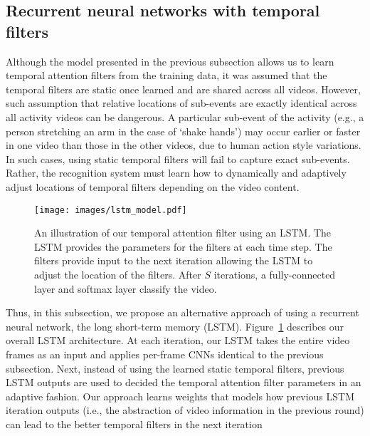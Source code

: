 \documentclass[letterpaper]{article}
\begin{document}
\subsection{Recurrent neural networks with temporal filters}
\label{subsec:lstm}

Although the model presented in the previous subsection allows us to learn temporal attention filters from the training data, it was assumed that the temporal filters are static once learned and are shared across all videos. However, such assumption that relative locations of sub-events are exactly identical across all activity videos can be dangerous. A particular sub-event of the activity (e.g., a person stretching an arm in the case of `shake hands') may occur earlier or faster in one video than those in the other videos, due to human action style variations. In such cases, using static temporal filters will fail to capture exact sub-events. Rather, the recognition system must learn how to dynamically and adaptively adjust locations of temporal filters depending on the video content.

\begin{figure}[!tbp]
\begin{center}
   \texttt{[image: images/lstm\_model.pdf]}
\end{center}
   \caption{An illustration of our temporal attention filter using an LSTM. The LSTM provides the parameters for the filters at each time step. The filters provide input to the next iteration allowing the LSTM to adjust the location of the filters. After $S$ iterations, a fully-connected layer and softmax layer classify the video. }
\label{fig:lstm_model}		
\end{figure}




Thus, in this subsection, we propose an alternative approach of using a recurrent neural network, the long short-term memory (LSTM). Figure~\ref{fig:lstm_model} describes our overall LSTM architecture. At each iteration, our LSTM takes the entire video frames as an input and applies per-frame CNNs identical to the previous subsection. Next, instead of using the learned static temporal filters, previous LSTM outputs are used to decided the temporal attention filter parameters in an adaptive fashion. Our approach learns weights that models how previous LSTM iteration outputs (i.e., the abstraction of video information in the previous round) can lead to the better temporal filters in the next iteration
\end{document}
